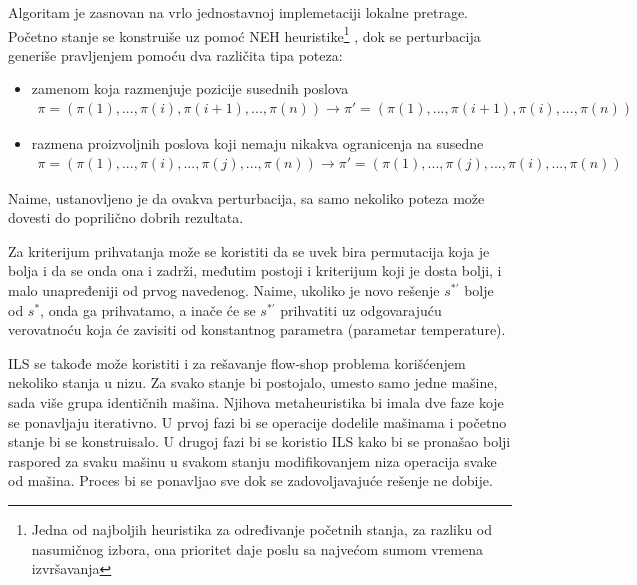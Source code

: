 \documentclass[a4paper]{article}
\newcommand{\sstar}[0]{$\textit{s}^*$}
\begin{document}
Algoritam je zasnovan na vrlo jednostavnoj implemetaciji lokalne pretrage. Početno stanje se konstruiše uz pomoć NEH heuristike\footnote{Jedna od najboljih heuristika za određivanje početnih stanja, za razliku od nasumičnog izbora, ona prioritet daje poslu sa najvećom sumom vremena izvršavanja }
, dok se perturbacija generiše pravljenjem pomoću dva različita tipa poteza:
\begin{itemize}
  \item zamenom koja razmenjuje pozicije susednih poslova \\
	\begin{gather*}
	 \pi = (\pi(1),..., \pi(i), \pi(i+1),..., \pi(n)) \rightarrow \pi\prime =  ( \pi(1),...,  \pi(i+1),  \pi(i),...,  \pi(n))
	\end{gather*}
  \item razmena proizvoljnih poslova koji nemaju nikakva ogranicenja na susedne \\
	\begin{gather*}
	 \pi = (\pi(1),..., \pi(i),..., \pi(j),..., \pi(n)) \rightarrow \pi\prime =  ( \pi(1),...,  \pi(j),...,  \pi(i),...,  \pi(n))
	\end{gather*}
\end{itemize}
Naime, ustanovljeno je da ovakva perturbacija, sa samo nekoliko poteza može dovesti do poprilično dobrih rezultata.


Za kriterijum prihvatanja može se koristiti da se uvek bira permutacija koja je bolja i da se onda ona i zadrži, međutim postoji i kriterijum koji je dosta bolji, i malo unapređeniji od prvog navedenog. Naime, ukoliko je novo rešenje $\textit{s}^{*\prime}$ bolje od \sstar{}, onda ga prihvatamo, a inače će se $\textit{s}^{*\prime}$ prihvatiti uz odgovarajuću verovatnoću
koja će zavisiti od konstantnog parametra  (parametar temperature).

ILS se takođe može koristiti i za rešavanje flow-shop problema korišćenjem nekoliko stanja u nizu. Za svako stanje bi postojalo, umesto samo jedne mašine, sada više grupa identičnih mašina. Njihova metaheuristika bi imala dve faze koje se ponavljaju iterativno. U prvoj fazi bi se operacije dodelile mašinama i početno stanje bi se konstruisalo. U drugoj fazi bi se koristio ILS kako bi se pronašao bolji raspored za svaku mašinu u svakom stanju modifikovanjem niza operacija svake od mašina. Proces bi se ponavljao sve dok se zadovoljavajuće rešenje ne dobije. \cite{applyingIteratedLocalSearchtothePermutation} 
\end{document}
